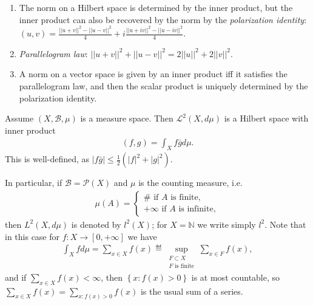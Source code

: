 \begin{enumerate}
    \item The norm on a Hilbert space is determined by the inner product, but the inner product can also be recovered by the norm by the 
    \emph{polarization identity}: \((u,v) = \frac{||u+v||^2 - ||u-v||^2}{4}+ i\frac{||u+iv||^2 - ||u-iv||^2}{4}\).
    \item \emph{Parallelogram law}: \(||u+v||^2 + ||u-v||^2 = 2||u||^2 + 2||v||^2\).
    \item A norm on a vector space is given by an inner product iff it satisfies the parallelogram law, and then the scalar product is 
    uniquely determined by the polarization identity. 
\end{enumerate}
\begin{example}
    Assume \(\left(X,\mathscr{B}, \mu\right)\) is a measure space. Then \(\mathcal{L}^2(X,d\mu)\) is a Hilbert space with inner product
    \begin{align*}
        (f,g) = \int_X f\bar{g}d\mu.
    \end{align*}
    This is well-defined, as \(|f\bar{g}|\leq \frac{1}{2}(|f|^2 + |g|^2)\). 

    In particular, if \(\mathscr{B} = \mathcal{P}(X)\) and \(\mu\) is the counting measure, i.e.
    \begin{align*}
        \mu(A) = \begin{cases}
            \# \text{ if } A \text{ is finite}, \\
            +\infty \text{ if } A \text{ is infinite},
        \end{cases}
    \end{align*}
    then \(L^2(X,d\mu)\) is denoted by \(l^2(X)\);
    for \(X=\mathbb{N}\) we write simply \(l^2\). Note that in this case for \(f:X\rightarrow [0,+\infty]\) we have
    \begin{align*}
        \int_X fd\mu = \sum\limits_{x\in X} f(x) \eqdef \sup\limits_{\substack{F\subset X \\ F\text{ is finite}}} \sum\limits_{x\in F} f(x),
    \end{align*}
    and if \(\sum_{x\in X}f(x)<\infty\), then \(\left\{x:f(x)>0\right\}\) is at most countable, so \(\sum_{x\in X}f(x) = \sum_{x:f(x)>0}f(x)\)
    is the usual sum of a series. 
\end{example}


